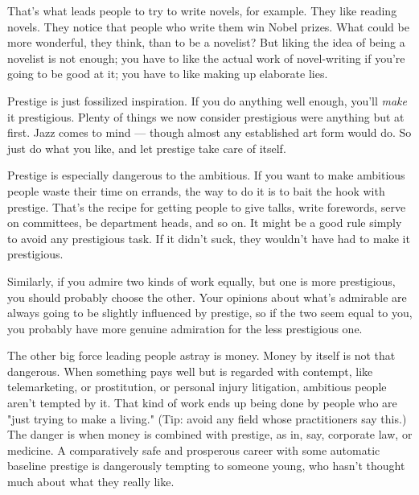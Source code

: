 That's
                    what leads people to try to write novels, for example. They
                    like reading novels. They notice that people who write them
                    win Nobel prizes. What could be more wonderful, they think,
                    than to be a novelist? But liking the idea of being a
                    novelist is not enough; you have to like the actual work of
                    novel-writing if you're going to be good at it; you have to
                    like making up elaborate lies.

Prestige is just
                    fossilized inspiration. If you do anything well enough,
                    you'll \emph{make} it prestigious. Plenty of things we now
                    consider prestigious were anything but at first. Jazz comes
                    to mind --- though almost any established art form would
                    do. So just do what you like, and let prestige take care of
                    itself.

Prestige is especially dangerous to the
                    ambitious. If you want to make ambitious people waste their
                    time on errands, the way to do it is to bait the hook with
                    prestige. That's the recipe for getting people to give
                    talks, write forewords, serve on committees, be department
                    heads, and so on. It might be a good rule simply to avoid
                    any prestigious task. If it didn't suck, they wouldn't have
                    had to make it prestigious.

Similarly, if you
                    admire two kinds of work equally, but one is more
                    prestigious, you should probably choose the other. Your
                    opinions about what's admirable are always going to be
                    slightly influenced by prestige, so if the two seem equal to
                    you, you probably have more genuine admiration for the less
                    prestigious one.

The other big force leading
                    people astray is money. Money by itself is not that
                    dangerous. When something pays well but is regarded with
                    contempt, like telemarketing, or prostitution, or personal
                    injury litigation, ambitious people aren't tempted by it.
                    That kind of work ends up being done by people who are "just
                    trying to make a living." (Tip: avoid any field whose
                    practitioners say this.) The danger is when money is
                    combined with prestige, as in, say, corporate law, or
                    medicine. A comparatively safe and prosperous career with
                    some automatic baseline prestige is dangerously tempting to
                    someone young, who hasn't thought much about what they
                    really like.

